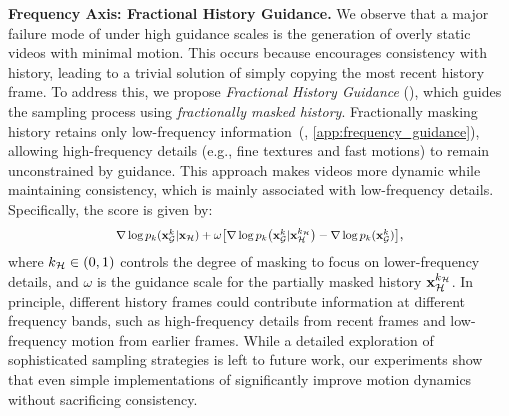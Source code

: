 \textbf{Frequency Axis: Fractional History Guidance.} 
We observe that a major failure mode of \HGv under high guidance scales is the generation of overly static videos with minimal motion. This occurs because \HGv encourages consistency with history, leading to a trivial solution of simply copying the most recent history frame. To address this, we propose \emph{Fractional History Guidance} (\HGf), which guides the sampling process using \emph{fractionally masked history}. Fractionally masking history retains only low-frequency information~(\citet{dieleman2024spectral}, \cref{app:frequency_guidance}), allowing high-frequency details (e.g., fine textures and fast motions) to remain unconstrained by guidance. This approach makes videos more dynamic while maintaining consistency, which is mainly associated with low-frequency details.
Specifically, the \HGf score is given by:
\vspace{-4pt}
\begin{equation} 
\label{eq:fractional_guidance}
\scalebox{0.85}{$
\score p_k(\xGk | \xH) + \omega \big[\score p_k\big(\xGk | \bx_{\cH}^{k_{\cH}}\big) - \score p_k(\xGk)\big]
$},
\vspace{-2pt}
\end{equation}
where $k_{\mathcal{H}} \in (0, 1)$ controls the degree of masking to focus on lower-frequency details, and $\omega$ is the guidance scale for the partially masked history ${\mathbf{x}}_{{\mathcal{H}}}^{k_{{\mathcal{H}}}}$.
In principle, different history frames could contribute information at different frequency bands, such as high-frequency details from recent frames and low-frequency motion from earlier frames. While a detailed exploration of sophisticated sampling strategies is left to future work, our experiments show that even simple implementations of \HGf significantly improve motion dynamics without sacrificing consistency.















